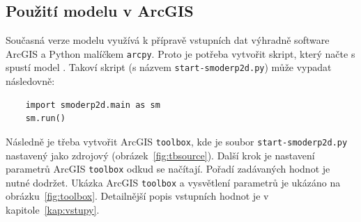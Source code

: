 \subsection{Použití modelu v ArcGIS}
  
  Současná verze modelu \smod využívá k přípravě vstupních dat výhradně software ArcGIS a Python malíčkem {\tt arcpy}. Proto je potřeba vytvořit skript, který načte s spustí model \smod. Takoví skript (s názvem {\tt start-smoderp2d.py}) může vypadat následovně:
  \begin{lstlisting}
    import smoderp2d.main as sm
    sm.run()
  \end{lstlisting}
  
  Následně je třeba vytvořit ArcGIS {\tt toolbox}, kde je soubor {\tt start-smoderp2d.py} nastavený jako zdrojový (obrázek~\ref{fig:tbsource}). Další krok je nastavení parametrů ArcGIS {\tt toolbox} odkud se načítají. Pořadí zadávaných hodnot je nutné dodržet. Ukázka ArcGIS {\tt toolbox} a vysvětlení parametrů je ukázáno na obrázku~\ref{fig:toolbox}. Detailnější popis vstupních hodnot je v kapitole~\ref{kap:vstupy}.
  
